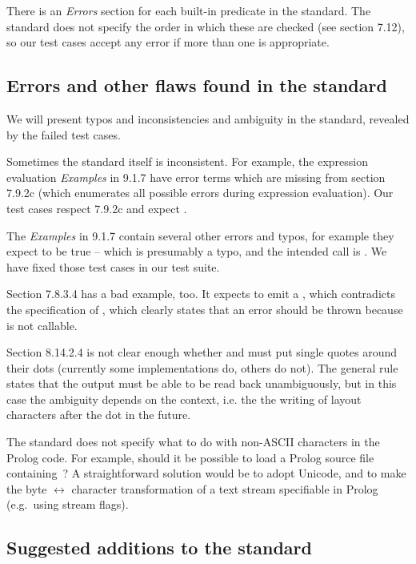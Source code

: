 \documentclass[draft]{llncs}%
\begin{document}
There is an \emph{Errors} section for each built-in predicate in the
standard. The standard does not specify the order in which these are checked
(see section 7.12), so our test cases accept any error if more than one is appropriate.


\subsection{Errors and other flaws found in the standard}

We will present typos and inconsistencies and ambiguity in
the standard, revealed by the failed test cases.

Sometimes the standard itself is inconsistent. For example, the expression
evaluation \emph{Examples} in 9.1.7 have error terms which are missing from
section 7.9.2c (which enumerates all possible errors during expression
evaluation). Our test cases respect 7.9.2c and expect
.

The \emph{Examples} in 9.1.7 contain several other errors and typos, for
example they expect  to be true -- which is presumably a
typo, and the intended call is . We have fixed those test
cases in our test suite.

Section 7.8.3.4 has a bad example, too. It expects
 to emit a , which contradicts the
specification of , which clearly states that an error should
be thrown because  is not callable.

Section 8.14.2.4 is not clear enough whether
 and
must put single quotes around their dots (currently some implementations do,
others do not). The
general rule states that the output must be able to be read back
unambiguously, but in this case the ambiguity depends on the context, i.e.
the the writing of layout characters after the dot in the future.

The standard does not specify what to do
with non-ASCII characters in the Prolog
code. For example, should it be possible to load a Prolog source file
containing \,? A straightforward solution would be to adopt
Unicode, and to make the byte $\leftrightarrow$ character
transformation of a text stream specifiable in Prolog (e.g.\
using stream flags).


\subsection{Suggested additions to the standard}
\end{document}
